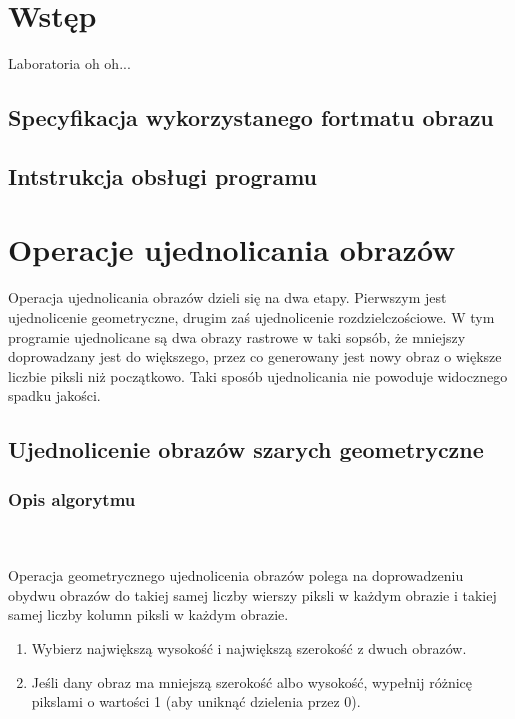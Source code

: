 \documentclass[final,a4paper,openany,12pt]{mwbk}
\begin{document}
\tableofcontents
\listoffigures

\sloppy


\chapter {Wstęp}

Laboratoria oh oh...~\cite{BookMok} %


\section {Specyfikacja wykorzystanego fortmatu obrazu}

\section {Intstrukcja obsługi programu}



\chapter{Operacje ujednolicania obrazów}
Operacja ujednolicania obrazów dzieli się na dwa etapy. Pierwszym jest ujednolicenie geometryczne, drugim zaś ujednolicenie rozdzielczościowe. W tym programie ujednolicane są dwa obrazy rastrowe w taki sopsób, że mniejszy doprowadzany jest do większego, przez co generowany jest nowy obraz o większe liczbie piksli niż początkowo. Taki sposób ujednolicania nie powoduje widocznego spadku jakości.
\newpage

\section{Ujednolicenie obrazów szarych geometryczne}
\subsection*{Opis algorytmu}
\hfill
\\\\
\indent Operacja geometrycznego ujednolicenia obrazów polega na doprowadzeniu obydwu obrazów do takiej samej liczby wierszy piksli w każdym obrazie i takiej samej liczby kolumn piksli w każdym obrazie.
\begin{enumerate}
	\item Wybierz największą wysokość i największą szerokość z dwuch obrazów.\\
	\item Jeśli dany obraz ma mniejszą szerokość albo wysokość, wypełnij różnicę pikslami o wartości 1 (aby uniknąć dzielenia przez 0).
\end{enumerate}
\end{document}
